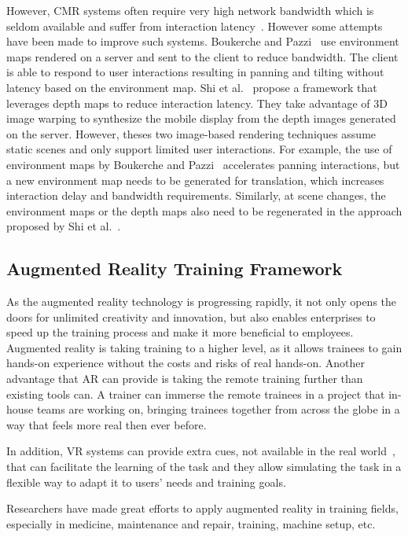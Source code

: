 However, CMR systems often require very high network bandwidth which is seldom available and suffer from interaction latency~\cite{chen2014}. However some attempts have been made to improve such systems. 
Boukerche and Pazzi~\cite{boukerche2006} use environment maps rendered on a server and sent to the client to reduce bandwidth. The client is able to respond to user interactions resulting in panning and tilting without latency based on the environment map.
Shi et al.~\cite{shi2012} propose a framework that leverages depth maps to reduce interaction latency. They take advantage of 3D image warping to synthesize the mobile display from the depth images generated on the server.
However, theses two image-based rendering techniques assume static scenes and only support limited user interactions.
For example, the use of environment maps by Boukerche and Pazzi~\cite{boukerche2006} accelerates panning interactions, but a new environment map needs to be generated for translation, which increases interaction delay and bandwidth requirements. Similarly, at scene changes, the environment maps or the depth maps also need to be regenerated in the approach proposed by Shi et al.~\cite{shi2012}.

\subsection{Augmented Reality Training Framework}

As the augmented reality technology is progressing rapidly, it not only opens the doors for unlimited creativity and innovation, but also enables enterprises to speed up the training process and make it more beneficial to employees.
Augmented reality is taking training to a higher level, as it allows trainees to gain hands-on experience without the costs and risks of real hands-on. Another advantage that AR can provide is taking the remote training further than existing tools can. A trainer can immerse the remote trainees in a project that in-house teams are working on, bringing trainees together from across the globe in a way that feels more real then ever before.

In addition, VR systems can provide extra cues, not available in the real world~\cite{gosselin2010}, that can facilitate the learning of the task and they allow simulating the task in a flexible way to adapt it to users' needs and training goals.

Researchers have made great efforts to apply augmented reality in training fields, especially in medicine, maintenance and repair, training, machine setup, etc.

